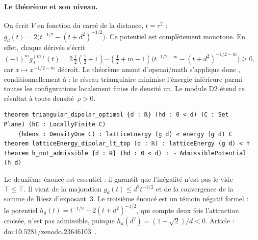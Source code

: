 \paragraph{Le théorème et son niveau.} On écrit $V$ en fonction du carré de la distance, $t=r^2$ :
$g_d(t)=2\bigl(t^{-1/2}-(t+d^2)^{-1/2}\bigr)$. Ce potentiel est complètement monotone. En effet, chaque dérivée
s'écrit
\[(-1)^m g_d^{(m)}(t)=2\,\tfrac12(\tfrac12+1)\cdots(\tfrac12+m-1)\bigl(t^{-1/2-m}-(t+d^2)^{-1/2-m}\bigr)\ge0,\]
car $x\mapsto x^{-1/2-m}$ décroît. Le théorème amont d'openai/math s'applique donc \tierA{}, conditionnellement à
 : le réseau triangulaire minimise l'énergie inférieure parmi toutes les
configurations localement finies de densité un. Le module D2 étend ce résultat à toute densité~$\rho>0$.
\begin{leanbox}
\begin{lstlisting}[language=Lean]
theorem triangular_dipolar_optimal {d : ℝ} (hd : 0 < d) (C : Set Plane) (hC : LocallyFinite C)
    (hdens : DensityOne C) : latticeEnergy (g d) ≤ energy (g d) C
theorem latticeEnergy_dipolar_lt_top (d : ℝ) : latticeEnergy (g d) < ⊤
theorem h_not_admissible {d : ℝ} (hd : 0 < d) : ¬ AdmissiblePotential (h d)
\end{lstlisting}
\end{leanbox}
Le deuxième énoncé est essentiel : il garantit que l'inégalité n'est pas le vide $\top\le\top$. Il vient de la
majoration $g_d(t)\le d^2t^{-3/2}$ et de la convergence de la somme de Riesz d'exposant~3. Le troisième énoncé
est un témoin négatif formel : le potentiel $h_d(t)=t^{-1/2}-2(t+d^2)^{-1/2}$, qui compte deux fois l'attraction
croisée, n'est pas admissible, puisque $h_d(d^2)=(1-\sqrt2)/d<0$. Article :
doi:10.5281/zenodo.23646103~\cite{ch2dip}.

